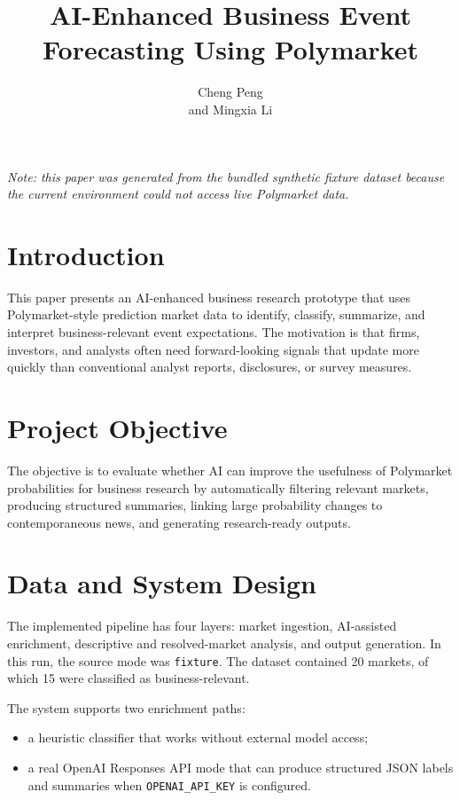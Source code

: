 \documentclass[12pt]{article}
\title{\textbf{AI-Enhanced Business Event Forecasting Using Polymarket}}
\author{Cheng Peng \\and Mingxia Li}
\date{}
\begin{document}
\maketitle

\noindent\textit{Note: this paper was generated from the bundled synthetic fixture dataset because the current environment could not access live Polymarket data.}\\

\section{Introduction}

This paper presents an AI-enhanced business research prototype that uses Polymarket-style prediction market data to identify, classify, summarize, and interpret business-relevant event expectations. The motivation is that firms, investors, and analysts often need forward-looking signals that update more quickly than conventional analyst reports, disclosures, or survey measures.

\section{Project Objective}

The objective is to evaluate whether AI can improve the usefulness of Polymarket probabilities for business research by automatically filtering relevant markets, producing structured summaries, linking large probability changes to contemporaneous news, and generating research-ready outputs.

\section{Data and System Design}

The implemented pipeline has four layers: market ingestion, AI-assisted enrichment, descriptive and resolved-market analysis, and output generation. In this run, the source mode was \texttt{fixture}. The dataset contained 20 markets, of which 15 were classified as business-relevant.

The system supports two enrichment paths:
\begin{itemize}
\item a heuristic classifier that works without external model access;
\item a real OpenAI Responses API mode that can produce structured JSON labels and summaries when \texttt{OPENAI\_API\_KEY} is configured.
\end{itemize}
\end{document}
